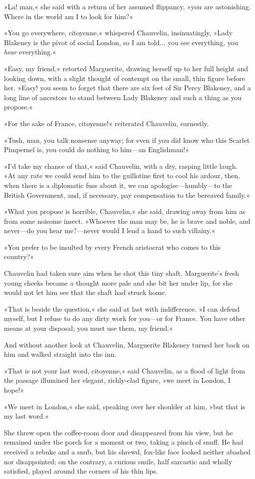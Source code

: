 »La! man,« she said with a return of her assumed flippancy, »you are astonishing. Where in the world am I to look for him?«

»You go everywhere, citoyenne,« whispered Chauvelin, insinuatingly, »Lady Blakeney is the pivot of social London, so I am told... you see everything, you \textit{hear} everything.«

»Easy, my friend,« retorted Marguerite, drawing herself up to her full height and looking down, with a slight thought of contempt on the small, thin figure before her. »Easy! you seem to forget that there are six feet of Sir Percy Blakeney, and a long line of ancestors to stand between Lady Blakeney and such a thing as you propose.«

»For the sake of France, citoyenne!« reiterated Chauvelin, earnestly.

»Tush, man, you talk nonsense anyway; for even if you did know who this Scarlet Pimpernel is, you could do nothing to him\allowbreak---\allowbreak an Englishman!«

»I'd take my chance of that,« said Chauvelin, with a dry, rasping little laugh. »At any rate we could send him to the guillotine first to cool his ardour, then, when there is a diplomatic fuss about it, we can apologise\allowbreak---\allowbreak humbly\allowbreak---\allowbreak to the British Government, and, if necessary, pay compensation to the bereaved family.«

»What you propose is horrible, Chauvelin,« she said, drawing away from him as from some noisome insect. »Whoever the man may be, he is brave and noble, and never\allowbreak---\allowbreak do you hear me?\allowbreak---\allowbreak never would I lend a hand to such villainy.«

»You prefer to be insulted by every French aristocrat who comes to this country?«

Chauvelin had taken sure aim when he shot this tiny shaft. Marguerite's fresh young cheeks became a thought more pale and she bit her under lip, for she would not let him see that the shaft had struck home.

»That is beside the question,« she said at last with indifference. »I can defend myself, but I refuse to do any dirty work for you\allowbreak---\allowbreak or for France. You have other means at your disposal; you must use them, my friend.«

And without another look at Chauvelin, Marguerite Blakeney turned her back on him and walked straight into the inn.

»That is not your last word, citoyenne,« said Chauvelin, as a flood of light from the passage illumined her elegant, richly-clad figure, »we meet in London, I hope!«

»We meet in London,« she said, speaking over her shoulder at him, »but that is my last word.«

She threw open the coffee-room door and disappeared from his view, but he remained under the porch for a moment or two, taking a pinch of snuff. He had received a rebuke and a snub, but his shrewd, fox-like face looked neither abashed nor disappointed; on the contrary, a curious smile, half sarcastic and wholly satisfied, played around the corners of his thin lips.